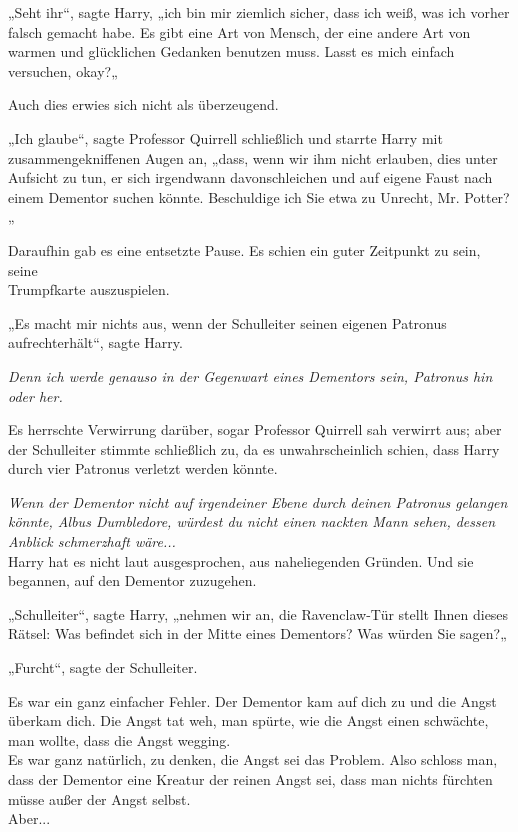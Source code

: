 {„Seht ihr“, sagte Harry, „ich bin mir ziemlich sicher, dass ich weiß, was ich vorher falsch gemacht habe. Es gibt eine Art von Mensch, der eine andere Art von warmen und glücklichen Gedanken benutzen muss. Lasst es mich einfach versuchen, okay?„

Auch dies erwies sich nicht als überzeugend.

„Ich glaube“, sagte Professor Quirrell schließlich und starrte Harry mit zusammengekniffenen Augen an, „dass, wenn wir ihm nicht erlauben, dies unter Aufsicht zu tun, er sich irgendwann davonschleichen und auf eigene Faust nach einem Dementor suchen könnte. Beschuldige ich Sie etwa zu Unrecht, Mr. Potter?„

Daraufhin gab es eine entsetzte Pause. Es schien ein guter Zeitpunkt zu sein, seine\\ Trumpfkarte auszuspielen.

„Es macht mir nichts aus, wenn der Schulleiter seinen eigenen Patronus aufrechterhält“, sagte Harry.

\emph{Denn ich werde genauso in der Gegenwart eines Dementors sein, Patronus hin oder her.}

Es herrschte Verwirrung darüber, sogar Professor Quirrell sah verwirrt aus; aber der Schulleiter stimmte schließlich zu, da es unwahrscheinlich schien, dass Harry durch vier Patronus verletzt werden könnte.

\emph{Wenn der Dementor nicht auf irgendeiner Ebene durch deinen Patronus gelangen könnte, Albus Dumbledore, würdest du nicht einen nackten Mann sehen, dessen Anblick schmerzhaft wäre...}\\ Harry hat es nicht laut ausgesprochen, aus naheliegenden Gründen. Und sie begannen, auf den Dementor zuzugehen.

„Schulleiter“, sagte Harry, „nehmen wir an, die Ravenclaw-Tür stellt Ihnen dieses Rätsel: Was befindet sich in der Mitte eines Dementors? Was würden Sie sagen?„

„Furcht“, sagte der Schulleiter.

Es war ein ganz einfacher Fehler. Der Dementor kam auf dich zu und die Angst überkam dich. Die Angst tat weh, man spürte, wie die Angst einen schwächte, man wollte, dass die Angst wegging.\\ Es war ganz natürlich, zu denken, die Angst sei das Problem. Also schloss man, dass der Dementor eine Kreatur der reinen Angst sei, dass man nichts fürchten müsse außer der Angst selbst.\\ Aber...

}
